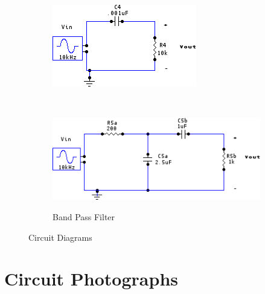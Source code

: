 \documentclass[a4paper,10pt]{report}
\begin{document}
\begin{figure}
\begin{subfigure}{.5\linewidth}
			\caption{}
			\label{fig:sub3}
		\end{subfigure}\hfill
		\begin{subfigure}{.5\linewidth}
			\centering
			\includegraphics[width=.9\linewidth]{./Circuits/HighPassFilter.png}
			\caption{}
			\label{fig:sub3}
		\end{subfigure}\hfill\null\\[1ex]\null\hfill
		\begin{subfigure}{\linewidth}
			\centering
			\includegraphics[width=.9\linewidth]{./Circuits/BandPassFilter.png}
			\label{fig:BandPassFilter}
			\caption{Band Pass Filter}
		\end{subfigure}\hfill\null
		\caption{Circuit Diagrams}
		\label{fig:test}

	\end{figure}

	\section{Circuit Photographs}
\end{document}
